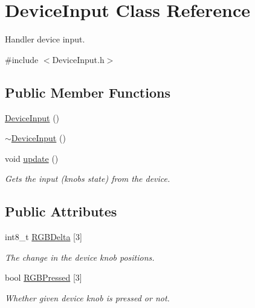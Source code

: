 \hypertarget{classDeviceInput}{}\section{Device\+Input Class Reference}
\label{classDeviceInput}


Handler device input.  




{\ttfamily \#include $<$Device\+Input.\+h$>$}

\subsection*{Public Member Functions}
\begin{DoxyCompactItemize}
\item 
\mbox{\hyperlink{classDeviceInput_a5a5d144c0a4a2d0fedfd85fcb687a716}{Device\+Input}} ()
\item 
\mbox{\hyperlink{classDeviceInput_a6c06d020cca58b3d4763e1717382b1a8}{$\sim$\+Device\+Input}} ()
\item 
\mbox{\label{classDeviceInput_ae6af261f4e6fa656dad4bd4a1efddbc6}} 
void \mbox{\hyperlink{classDeviceInput_ae6af261f4e6fa656dad4bd4a1efddbc6}{update}} ()
\begin{DoxyCompactList}\small\item\em Gets the input (knobs state) from the device. \end{DoxyCompactList}\end{DoxyCompactItemize}
\subsection*{Public Attributes}
\begin{DoxyCompactItemize}
\item 
\mbox{\label{classDeviceInput_a2dae4108527f110262644b6a2609a213}} 
int8\+\_\+t \mbox{\hyperlink{classDeviceInput_a2dae4108527f110262644b6a2609a213}{R\+G\+B\+Delta}} \mbox{[}3\mbox{]}
\begin{DoxyCompactList}\small\item\em The change in the device knob positions. \end{DoxyCompactList}\item 
\mbox{\label{classDeviceInput_a27dd22c6d022b77c645899a8793d511a}} 
bool \mbox{\hyperlink{classDeviceInput_a27dd22c6d022b77c645899a8793d511a}{R\+G\+B\+Pressed}} \mbox{[}3\mbox{]}
\begin{DoxyCompactList}\small\item\em Whether given device knob is pressed or not. \end{DoxyCompactList}\end{DoxyCompactItemize}


